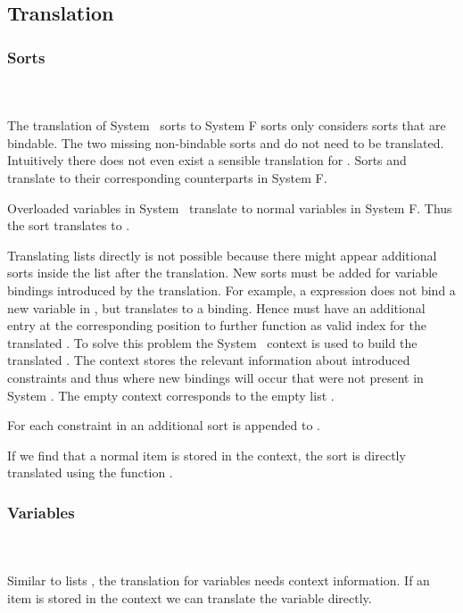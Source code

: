 \subsection{Translation}
\subsubsection{Sorts}\hfill\\\\
The translation of System \Fo\ sorts to System F sorts only considers sorts that are bindable. 
The two missing non-bindable sorts  and  do not need to be translated. 
Intuitively there does not even exist a sensible translation for .
\DPTSort
Sorts  and  translate to their corresponding counterparts in System F. 

\noindent  Overloaded variables in System \Fo\ translate to normal variables in System F. 
Thus the sort  translates to . 

\noindent Translating lists  directly is not possible because there might appear additional sorts inside the list after the translation. 
New sorts must be added for variable bindings introduced by the translation. 
For example, a    \Constr{=}    expression does not bind a new variable in , but translates to a     binding. 
Hence  must have an additional entry  at the corresponding position to further function as valid index for the translated . 
To solve this problem the System \Fo\ context  is used to build the translated . 
The context stores the relevant information about introduced constraints and thus where new bindings will occur that were not present in System \Fo. 
\DPTSorts
The empty context  corresponds to the empty list \Constr{[]}.

\noindent For each constraint in  an additional sort  is appended to .

\noindent If we find that a normal item is stored in the context, the sort  is directly translated using the function .

\subsubsection{Variables}\hfill\\\\
Similar to lists , the translation for variables  needs context information.  
\DPTVar
If an item is stored in the context we can translate the variable directly. 

